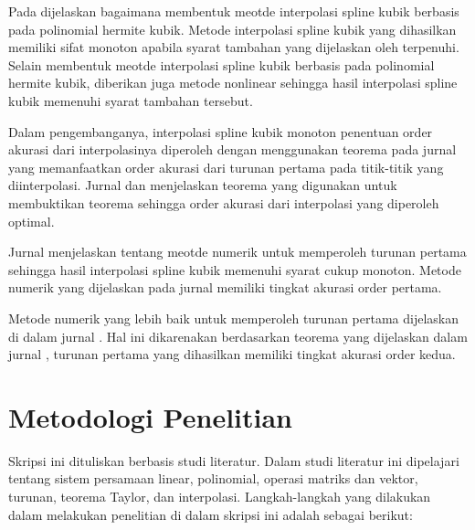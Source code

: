 Pada  dijelaskan bagaimana membentuk meotde interpolasi spline kubik berbasis pada polinomial hermite kubik. Metode interpolasi spline kubik yang dihasilkan memiliki sifat monoton apabila syarat tambahan yang dijelaskan oleh  terpenuhi. Selain membentuk meotde interpolasi spline kubik berbasis pada polinomial hermite kubik, diberikan juga metode nonlinear sehingga hasil interpolasi spline kubik memenuhi syarat tambahan tersebut.

Dalam pengembanganya, interpolasi spline kubik monoton penentuan order akurasi dari interpolasinya diperoleh dengan menggunakan teorema pada jurnal  yang memanfaatkan order akurasi dari turunan pertama pada titik-titik yang diinterpolasi. Jurnal  dan  menjelaskan teorema yang digunakan untuk membuktikan teorema  sehingga order akurasi dari interpolasi yang diperoleh optimal.

Jurnal  menjelaskan tentang meotde numerik untuk memperoleh turunan pertama sehingga hasil interpolasi spline kubik memenuhi syarat cukup monoton. Metode numerik yang dijelaskan pada jurnal  memiliki tingkat akurasi order pertama.

Metode numerik yang lebih baik untuk memperoleh turunan pertama dijelaskan di dalam jurnal . Hal ini dikarenakan berdasarkan teorema yang dijelaskan dalam jurnal , turunan pertama yang dihasilkan memiliki tingkat akurasi order kedua.

\section{Metodologi Penelitian}

Skripsi ini dituliskan berbasis studi literatur. Dalam studi literatur ini dipelajari tentang sistem persamaan linear, polinomial, operasi matriks dan vektor, turunan, teorema Taylor, dan interpolasi. Langkah-langkah yang dilakukan dalam melakukan penelitian di dalam skripsi ini adalah sebagai berikut:

